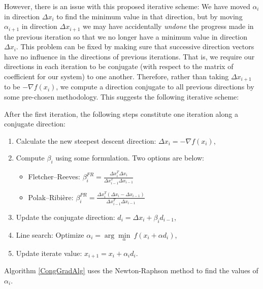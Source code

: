 However, there is an issue with this proposed iterative scheme: We have moved $\alpha_i$ in direction $\Delta x_i$ to find the minimum value in that direction, but by moving $\alpha_{i+1}$ in direction $\Delta x_{i+1}$ we may have accidentally \textit{undone} the progress made in the previous iteration so that we no longer have a minimum value in direction $\Delta x_i$. This problem can be fixed by making sure that successive direction vectors have no influence in the directions of previous iterations. That is, we require our directions in each iteration to be conjugate (with respect to the matrix of coefficient for our system) to one another. Therefore, rather than taking $\Delta x_{i+1}$ to be $-\nabla f(x_i)$, we compute a direction conjugate to all previous directions by some pre-chosen methodology. This suggests the following iterative scheme:

After the first iteration, the following steps constitute one iteration along a conjugate direction:
\begin{enumerate}
	\item Calculate the new steepest descent direction: $\Delta x_i=-\nabla f(x_i)$,
	\item Compute $\beta_i$ using some formulation. Two options are below:
	\begin{itemize}
		\item Fletcher--Reeves: $\beta_i^{FR}=\frac{\Delta x_i^T\Delta x_i}{\Delta x_{i-1}^T\Delta x_{i-1}}$
		\item Polak--Ribi\`{e}re: $\beta_{i}^{PR}=\frac{\Delta x_i^T(\Delta x_i-\Delta x_{i-1})}{\Delta x_{i-1}^T\Delta x_{i-1}}$
	\end{itemize}
	\item Update the conjugate direction: $d_i=\Delta x_i+\beta_i d_{i-1}$,
	\item Line search: Optimize $\alpha_i =\arg\underset{\alpha}{\min}\ f(x_i+\alpha d_i)$,
	\item Update iterate value: $x_{i+1}=x_i+\alpha_i d_i$.
\end{enumerate}

Algorithm \ref{CongGradAlg} uses the Newton-Raphson method to find the values of $\alpha_i$.

